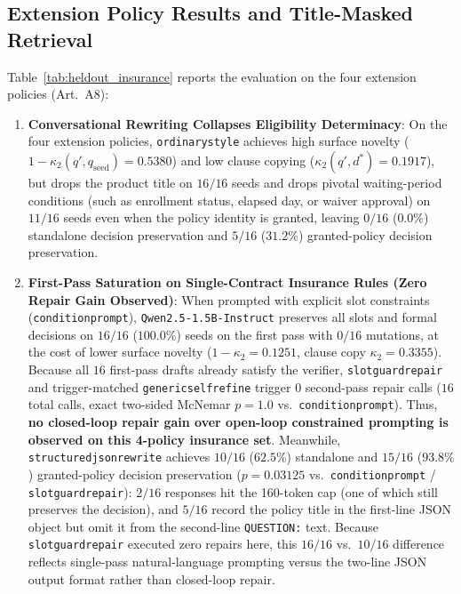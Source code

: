 \documentclass[10pt,twocolumn]{article}
\renewcommand{\_}{\textunderscore\allowbreak}
\begin{document}
\subsection{Extension Policy Results and Title-Masked Retrieval}
Table~\ref{tab:heldout_insurance} reports the evaluation on the four extension policies (Art.~A8):
\begin{enumerate}[leftmargin=*,nosep]
  \item \textbf{Conversational Rewriting Collapses Eligibility Determinacy}: On the four extension policies, \texttt{ordinary\_style} achieves high surface novelty ($1-\kappa_2(q', q_{\text{seed}}) = 0.5380$) and low clause copying ($\kappa_2(q', d^*) = 0.1917$), but drops the product title on $16/16$ seeds and drops pivotal waiting-period conditions (such as enrollment status, elapsed day, or waiver approval) on $11/16$ seeds even when the policy identity is granted, leaving $0/16$ ($0.0\%$) standalone decision preservation and $5/16$ ($31.2\%$) granted-policy decision preservation.
  \item \textbf{First-Pass Saturation on Single-Contract Insurance Rules (Zero Repair Gain Observed)}: When prompted with explicit slot constraints (\texttt{condition\_prompt}), \texttt{Qwen2.5-1.5B-Instruct} preserves all slots and formal decisions on $16/16$ ($100.0\%$) seeds on the first pass with $0/16$ mutations, at the cost of lower surface novelty ($1-\kappa_2 = 0.1251$, clause copy $\kappa_2 = 0.3355$). Because all $16$ first-pass drafts already satisfy the verifier, \texttt{slot\_guard\_repair} and trigger-matched \texttt{generic\_self\_refine} trigger $0$ second-pass repair calls ($16$ total calls, exact two-sided McNemar $p=1.0$ vs.\ \texttt{condition\_prompt}). Thus, \textbf{no closed-loop repair gain over open-loop constrained prompting is observed on this 4-policy insurance set}. Meanwhile, \texttt{structured\_json\_rewrite} achieves $10/16$ ($62.5\%$) standalone and $15/16$ ($93.8\%$) granted-policy decision preservation ($p=0.03125$ vs.\ \texttt{condition\_prompt} / \texttt{slot\_guard\_repair}): $2/16$ responses hit the 160-token cap (one of which still preserves the decision), and $5/16$ record the policy title in the first-line JSON object but omit it from the second-line \texttt{QUESTION:} text. Because \texttt{slot\_guard\_repair} executed zero repairs here, this $16/16$ vs.\ $10/16$ difference reflects single-pass natural-language prompting versus the two-line JSON output format rather than closed-loop repair.

\end{enumerate}
\end{document}
